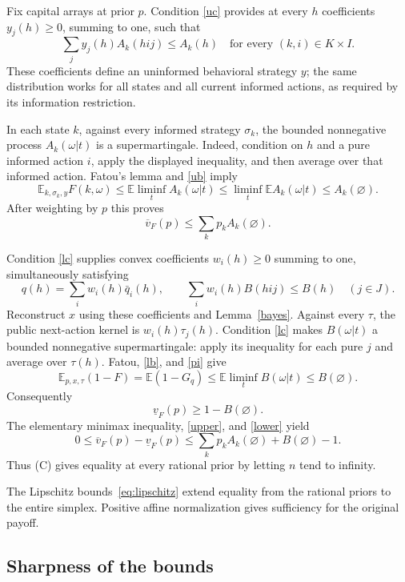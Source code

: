 \documentclass[11pt,a4paper]{article}
\theoremstyle{definition}
\theoremstyle{remark}
\newcommand{\E}{\mathbb E}
\newcommand{\lv}{\underline v}
\newcommand{\uv}{\overline v}
\begin{document}
Fix capital arrays at prior $p$. Condition \eqref{uc} provides at every
$h$ coefficients $y_j(h)\geq0$, summing to one, such that
\[
 \sum_j y_j(h)A_k(hij)\leq A_k(h)
 \quad\text{for every }(k,i)\in K\times I.
\]
These coefficients define an uninformed behavioral strategy $y$; the
same distribution works for all states and all current informed
actions, as required by its information restriction.

In each state $k$, against every informed strategy $\sigma_k$, the
bounded nonnegative process $A_k(\omega|t)$ is a supermartingale.
Indeed, condition on $h$ and a pure informed action $i$, apply the
displayed inequality, and then average over that informed action.
Fatou's lemma and \eqref{ub} imply
\[
 \E_{k,\sigma_k,y}F(k,\omega)
 \leq\E\liminf_t A_k(\omega|t)
 \leq\liminf_t\E A_k(\omega|t)
 \leq A_k(\varnothing).
\]
After weighting by $p$ this proves
\begin{equation}
 \uv_F(p)\leq\sum_k p_k A_k(\varnothing).
 \label{upper}
\end{equation}

Condition \eqref{lc} supplies convex coefficients $w_i(h)\geq0$ summing
to one, simultaneously satisfying
\[
 q(h)=\sum_i w_i(h)\bar q_i(h),\qquad
 \sum_i w_i(h)B(hij)\leq B(h)\quad(j\in J).
\]
Reconstruct $x$ using these coefficients and Lemma~\ref{bayes}. Against every
$\tau$, the public next-action kernel is
$w_i(h)\tau_j(h)$. Condition \eqref{lc} makes $B(\omega|t)$ a bounded
nonnegative supermartingale: apply its inequality for each pure $j$
and average over $\tau(h)$. Fatou, \eqref{lb}, and \eqref{pi} give
\[
 \E_{p,x,\tau}(1-F)=\E(1-G_q)
 \leq\E\liminf_t B(\omega|t)\leq B(\varnothing).
\]
Consequently
\begin{equation}
 \lv_F(p)\geq1-B(\varnothing).
 \label{lower}
\end{equation}
The elementary minimax inequality, \eqref{upper}, and \eqref{lower}
yield
\begin{equation}
 0\leq\uv_F(p)-\lv_F(p)
 \leq\sum_k p_k A_k(\varnothing)+B(\varnothing)-1.
 \label{gapbound}
\end{equation}
Thus (C) gives equality at every rational prior by letting $n$ tend to
infinity.

The Lipschitz bounds~\eqref{eq:lipschitz} extend equality from the
rational priors to the entire simplex. Positive affine normalization
gives sufficiency for the original payoff.

\subsection{Sharpness of the bounds}
\end{document}
